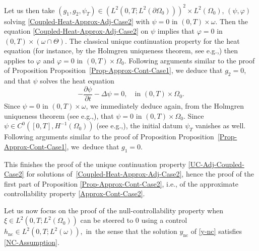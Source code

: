 \documentclass[11pt]{article}
\newcommand{\ie}{i.e.,\xspace}
\newcommand{\eg}{e.g.,\xspace}
\numberwithin{equation}{section}
\newcommand{\nc}{\mathrm{nc}}
\theoremstyle{definition}
\begin{document}
Let us then take $(g_1, g_2, \psi_T) \in (L^2(0,T; L^2(\partial\Omega_0)))^2\times L^2(\Omega_0)$, $(\psi, \varphi)$ solving \eqref{Coupled-Heat-Approx-Adj-Case2} with $\psi = 0$ in $(0,T) \times \omega$. Then the equation \eqref{Coupled-Heat-Approx-Adj-Case2} on $\psi$ implies that $\varphi = 0$ in $(0,T)\times {(\omega\cap \Theta)}$. The classical unique continuation property for the heat equation (for instance, by the Holmgren uniqueness theorem, see \eg \cite[\S8.6 \& Th.\,8.6.5]{Hormander-2003}) then applies to $\varphi$ and $\varphi = 0$ in $(0,T)\times \Omega_0$. Following arguments similar to the proof of Proposition Proposition~\ref{Prop-Approx-Cont-Case1}, we deduce that $g_2 = 0$, and that $\psi$ solves the heat equation
\[
-\dfrac{\partial \psi}{\partial t}-\Delta \psi =0, \quad \text{in }(0,T) \times \Omega_0.
\]
Since $\psi = 0$ in $(0,T) \times \omega$, we immediately deduce again, from the Holmgren uniqueness theorem (see \eg \cite[\S8.6 \& Th.\,8.6.5]{Hormander-2003}), that $\psi = 0$ in $(0,T) \times \Omega_0$. Since $\psi\in C^0([0,T],H^{-1}(\Omega_0))$ (see \eg \cite[Prop.\,7.1.3]{TWBook}), the initial datum $\psi_T$ vanishes as well. Following arguments similar to the proof of Proposition Proposition~\ref{Prop-Approx-Cont-Case1}, we~deduce that $g_1 = 0$.

This finishes the proof of the unique continuation property \eqref{UC-Adj-Coupled-Case2} for solutions of~\eqref{Coupled-Heat-Approx-Adj-Case2}, hence the proof of the first part of Proposition \ref{Prop-Approx-Cont-Case2}, \ie of the approximate controllability property \eqref{Approx-Cont-Case2}.

Let us now focus on the proof of the null-controllability property when~$\xi\in L^2(0,T; L^2(\Omega_0))$ can be steered to $0$ using a control $h_{\nc} \!\in\! L^2(0,T; L^2(\omega))$,~in~the sense that the solution $y_{\nc}$ of \eqref{y-nc} satisfies \eqref{NC-Assumption}.
\end{document}
